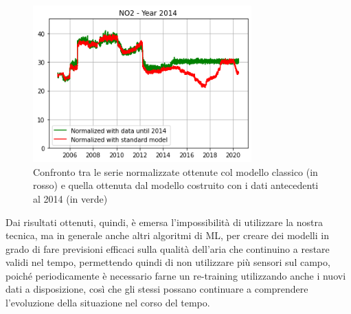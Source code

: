 \documentclass[a4paper]{report}
\begin{document}
\begin{figure}[h]
\centering
\includegraphics[width=0.75\textwidth]{no2_mantova_2014}
\caption{Confronto tra le serie normalizzate ottenute col modello classico (in rosso) e quella ottenuta dal modello costruito con i dati antecedenti al 2014 (in verde)}
\label{fig:no2_mantova_2014}
\end{figure}

Dai risultati ottenuti, quindi, è emersa l'impossibilità di utilizzare la nostra tecnica, ma in generale anche altri algoritmi di ML, per creare dei modelli in grado di fare previsioni efficaci sulla qualità dell'aria che continuino a restare validi nel tempo, permettendo quindi di non utilizzare più sensori sul campo, poiché periodicamente è necessario farne un re-training utilizzando anche i nuovi dati a disposizione, così che gli stessi possano continuare a comprendere l'evoluzione della situazione nel corso del tempo.  
\end{document}
